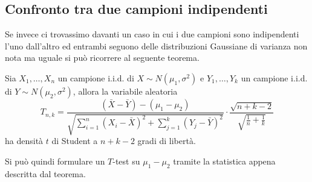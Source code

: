 \subsection{Confronto tra due campioni indipendenti}
Se invece ci trovassimo davanti un caso in cui i due campioni sono indipendenti l'uno dall'altro ed
entrambi seguono delle distribuzioni Gaussiane di varianza non nota ma uguale si può ricorrere al
seguente teorema.

\begin{theorem}\label{th: confronto}
	Sia $X_1, \dots, X_n$ un campione i.i.d. di $X \sim N(\mu_1, \sigma^2)$ e $Y_1, \dots, Y_k$ un
	campione i.i.d. di $Y \sim N(\mu_2, \sigma^2)$, allora la variabile aleatoria
	\[
		T_{n,k} = \frac{(\bar{X} - \bar{Y}) - (\mu_1 - \mu_2)}
		{\sqrt{\sum_{i=1}^n (X_i - \bar{X})^2 + \sum_{j=1}^k (Y_j - \bar{Y})^2}} \cdot
		\frac{\sqrt{n+k-2}}{\sqrt{\frac{1}{n} + \frac{1}{k}}}
	\]
	ha densità $t$ di Student a $n+k-2$ gradi di libertà.
\end{theorem}

Si può quindi formulare un $T$-test su $\mu_1 - \mu_2$ tramite la statistica appena descritta dal
teorema.


